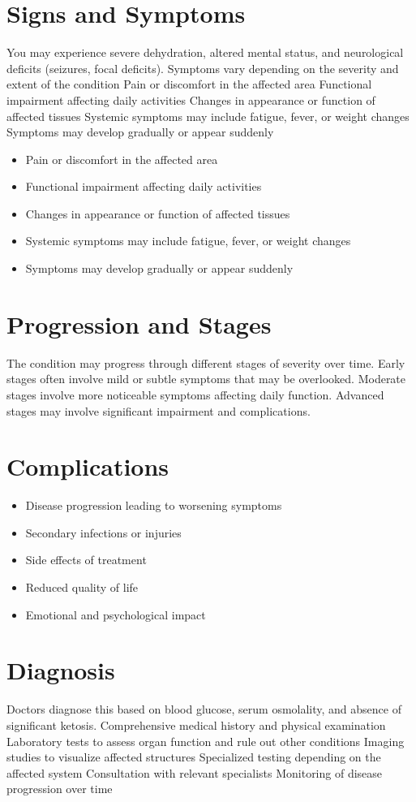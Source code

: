\section{Signs and Symptoms}
You may experience severe dehydration, altered mental status, and neurological deficits (seizures, focal deficits). Symptoms vary depending on the severity and extent of the condition Pain or discomfort in the affected area Functional impairment affecting daily activities Changes in appearance or function of affected tissues Systemic symptoms may include fatigue, fever, or weight changes Symptoms may develop gradually or appear suddenly

\begin{itemize}[noitemsep]
  \item Pain or discomfort in the affected area
  \item Functional impairment affecting daily activities
  \item Changes in appearance or function of affected tissues
  \item Systemic symptoms may include fatigue, fever, or weight changes
  \item Symptoms may develop gradually or appear suddenly
\end{itemize}
\section{Progression and Stages}
The condition may progress through different stages of severity over time. Early stages often involve mild or subtle symptoms that may be overlooked. Moderate stages involve more noticeable symptoms affecting daily function. Advanced stages may involve significant impairment and complications.
\section{Complications}
\begin{itemize}[noitemsep]
  \item Disease progression leading to worsening symptoms
  \item Secondary infections or injuries
  \item Side effects of treatment
  \item Reduced quality of life
  \item Emotional and psychological impact
\end{itemize}
\section{Diagnosis}
Doctors diagnose this based on blood glucose, serum osmolality, and absence of significant ketosis. Comprehensive medical history and physical examination Laboratory tests to assess organ function and rule out other conditions Imaging studies to visualize affected structures Specialized testing depending on the affected system Consultation with relevant specialists Monitoring of disease progression over time

